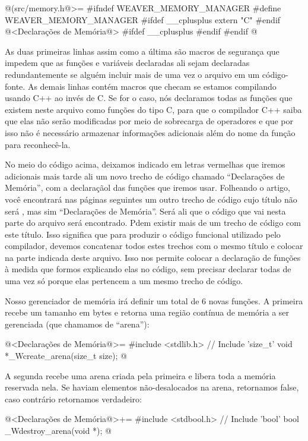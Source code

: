 \quebra

\iniciocodigo
@(src/memory.h@>=
#ifndef WEAVER_MEMORY_MANAGER
#define WEAVER_MEMORY_MANAGER
#ifdef __cplusplus
extern "C" {
#endif
@<Declarações de Memória@>
#ifdef __cplusplus
}
#endif
#endif
@
\fimcodigo

As duas primeiras linhas assim como a última são macros de segurança
que impedem que as funções e variáveis declaradas ali sejam declaradas
redundantemente se alguém incluir mais de uma vez o arquivo em um
código-fonte. As demais linhas contém macros que checam se estamos
compilando usando C++ ao invés de C. Se for o caso, nós declaramos
todas as funções que existem neste arquivo como funções do tipo C,
para que o compilador C++ saiba que elas não serão modificadas por
meio de sobrecarga de operadores e que por isso não é necessário
armazenar informações adicionais além do nome da função para
reconhecê-la.

No meio do código acima, deixamos indicado em letras vermelhas que
iremos adicionais mais tarde ali um novo trecho de código chamado
``Declarações de Memória'', com a declaraçãol das funções que iremos
usar. Folheando o artigo, você encontrará nas páginas seguintes um
outro trecho de código cujo título não será , mas
sim ``Declarações de Memória''. Será ali que o código que vai nesta
parte do arquivo será encontrado. Pdem existir mais de um trecho de
código com este título. Isso significa que para produzir o código
funcional utilizado pelo compilador, devemos concatenar todos estes
trechos com o mesmo título e colocar na parte indicada deste
arquivo. Isso nos permite colocar a declaração de funções à medida que
formos explicando elas no código, sem precisar declarar todas de uma
vez só porque elas pertencem a um mesmo trecho de código.


Nosso gerenciador de memória irá definir um total de 6 novas
funções. A primeira recebe um tamanho em bytes e retorna uma região
contínua de memória a ser gerenciada (que chamamos de ``arena''):

\iniciocodigo
@<Declarações de Memória@>=
#include <stdlib.h> // Include 'size_t'
void *_Wcreate_arena(size_t size);
@
\fimcodigo

A segunda recebe uma arena criada pela primeira e libera toda a memória
reservada nela. Se haviam elementos não-desalocados na arena, retornamos
false, caso contrário retornamos verdadeiro:

\iniciocodigo
@<Declarações de Memória@>+=
#include <stdbool.h> // Include 'bool'
bool _Wdestroy_arena(void *);
@
\fimcodigo

